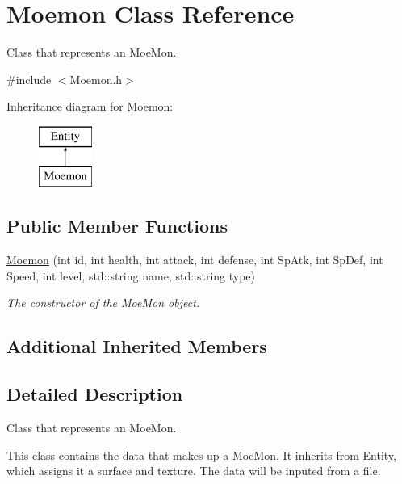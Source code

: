 \hypertarget{class_moemon}{\section{Moemon Class Reference}
\label{class_moemon}
}


Class that represents an Moe\+Mon.  




{\ttfamily \#include $<$Moemon.\+h$>$}

Inheritance diagram for Moemon\+:\begin{figure}[H]
\begin{center}
\leavevmode
\includegraphics[height=2.000000cm]{class_moemon}
\end{center}
\end{figure}
\subsection*{Public Member Functions}
\begin{DoxyCompactItemize}
\item 
\hyperlink{class_moemon_a97eba25498b958c11e237c6e4bd868b2}{Moemon} (int id, int health, int attack, int defense, int Sp\+Atk, int Sp\+Def, int Speed, int level, std\+::string name, std\+::string type)
\begin{DoxyCompactList}\small\item\em The constructor of the Moe\+Mon object. \end{DoxyCompactList}\end{DoxyCompactItemize}
\subsection*{Additional Inherited Members}


\subsection{Detailed Description}
Class that represents an Moe\+Mon. 

This class contains the data that makes up a Moe\+Mon. It inherits from \hyperlink{class_entity}{Entity}, which assigns it a surface and texture. The data will be inputed from a file. 

